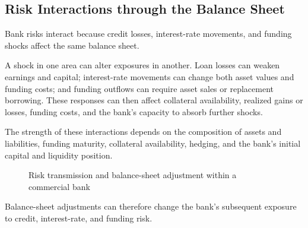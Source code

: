 \subsection{Risk Interactions through the Balance Sheet}

Bank risks interact because credit losses, interest-rate movements, and funding shocks affect the same balance sheet.

A shock in one area can alter exposures in another. Loan losses can weaken earnings and capital; interest-rate movements can change both asset values and funding costs; and funding outflows can require asset sales or replacement borrowing. These responses can then affect collateral availability, realized gains or losses, funding costs, and the bank's capacity to absorb further shocks.

The strength of these interactions depends on the composition of assets and liabilities, funding maturity, collateral availability, hedging, and the bank's initial capital and liquidity position.

\begin{figure}[H]
\centering


\caption{Risk transmission and balance-sheet adjustment within a commercial bank}
\label{fig:ch12-integrated-risk-interactions}
\end{figure}
Balance-sheet adjustments can therefore change the bank's subsequent exposure to credit, interest-rate, and funding risk.

